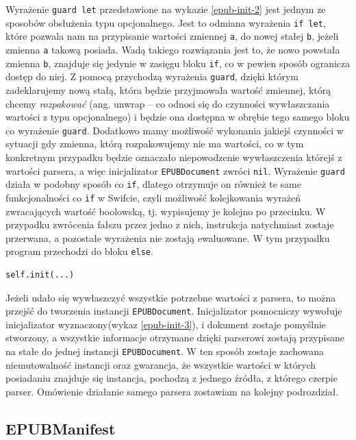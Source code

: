 Wyrażenie \texttt{guard let} przedstawione na wykazie \ref{epub-init-2} jest jednym ze sposobów obsłużenia typu opcjonalnego. Jest to odmiana wyrażenia \texttt{if let}, które pozwala nam na przypisanie wartości zmiennej \texttt{a}, do nowej stałej \texttt{b}, jeżeli zmienna \texttt{a} takową posiada. Wadą takiego rozwiązania jest to, że nowo powstała zmienna \texttt{b}, znajduje się jedynie w zasięgu bloku \texttt{if}, co w pewien sposób ogranicza dostęp do niej. Z pomocą przychodzą wyrażenia \texttt{guard}, dzięki którym zadeklarujemy nową stałą, która będzie przyjmowała wartość zmiennej, którą chcemy \textit{rozpakować} (ang. unwrap -- co odnosi się do czynności wywłaszczania wartości z typu opcjonalnego) i będzie ona dostępna w obrębie tego samego bloku co wyrażenie \texttt{guard}. Dodatkowo mamy możliwość wykonania jakiejś czynności w sytuacji gdy zmienna, którą rozpakowujemy nie ma wartości, co w tym konkretnym przypadku będzie oznaczało niepowodzenie wywłaszczenia którejś z wartości parsera, a więc inicjalizator \texttt{EPUBDocument} zwróci \texttt{nil}. Wyrażenie \texttt{guard} działa w podobny sposób co \texttt{if}, dlatego otrzymuje on również te same funkcjonalności co \texttt{if} w Swifcie, czyli możliwość kolejkowania wyrażeń zwracających wartość boolowską, tj. wypisujemy je kolejno po przecinku. W przypadku zwrócenia fałszu przez jedno z nich, instrukcja natychmiast zostaje przerwana, a pozostałe wyrażenia nie zostają ewaluowane. W tym przypadku program przechodzi do bloku \texttt{else}.

\begin{lstlisting}[language=swift-reference,caption={Inicjalizaca danymi z parsera},label={epub-init-3}]
self.init(...)
\end{lstlisting}

Jeżeli udało się wywłaszczyć wszystkie potrzebne wartości z parsera, to można przejść do tworzenia instancji \texttt{EPUBDocument}. Inicjalizator pomocniczy wywołuje inicjalizator wyznaczony(wykaz \ref{epub-init-3}), i dokument zostaje pomyślnie stworzony, a wszystkie informacje otrzymane dzięki parserowi zostają przypisane na stałe do jednej instancji \texttt{EPUBDocument}. W ten sposób zostaje zachowana niemutowalność instancji oraz gwarancja, że wszystkie wartości w których posiadaniu znajduje się instancja, pochodzą z jednego źródła, z którego czerpie parser. Omówienie działanie samego parsera zostawiam na kolejny podrozdział.

\subsection{EPUBManifest}

